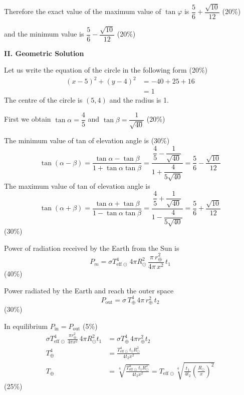 Therefore the exact value of the maximum value of $\tan\varphi$ is
$\dfrac{5}{6} + \dfrac{\sqrt{10}}{12}$ \hfill(20\%)

and the minimum value is $\dfrac{5}{6} - \dfrac{\sqrt{10}}{12}$ \hfill(20\%)

\textbf{II. Geometric Solution}

Let us write the equation of the circle in the following form \hfill(20\%)
\begin{align*}
(x-5)^2 + (y-4)^2 &= -40 + 25 + 16\\
                  &= 1
\end{align*}
The centre of the circle is $(5,4)$ and the radius is 1.

First we obtain $\tan\alpha = \dfrac{4}{5}$ and
$\tan\beta = \dfrac{1}{\sqrt{40}}$ \hfill(20\%)

The minimum value of tan of elevation angle is \hfill(30\%)
\[
\tan(\alpha-\beta) = \frac{\tan\alpha - \tan\beta}{1 + \tan\alpha\tan\beta}
 = \frac{\dfrac{4}{5} - \dfrac{1}{\sqrt{40}}}{1 + \dfrac{4}{5\sqrt{40}}}
 = \frac{5}{6} - \frac{\sqrt{10}}{12}
\]
The maximum value of tan of elevation angle is
\[
\tan(\alpha+\beta) = \frac{\tan\alpha + \tan\beta}{1 - \tan\alpha\tan\beta}
 = \frac{\dfrac{4}{5} + \dfrac{1}{\sqrt{40}}}{1 - \dfrac{4}{5\sqrt{40}}}
 = \frac{5}{6} + \frac{\sqrt{10}}{12}
\]
\hfill(30\%)

Power of radiation received by the Earth from the Sun is
\[
P_m = \sigma T_{\mathrm{eff}\,\odot}^{4}\, 4\pi R_\odot^2\,
      \frac{\pi\, r_\oplus^2}{4\pi\, x^2}\, t_1
\]
\hfill(40\%)

Power radiated by the Earth and reach the outer space
\[
P_{\mathrm{out}} = \sigma\, T_\oplus^4\, 4\pi\, r_\oplus^2\, t_2
\]
\hfill(30\%)

In equilibrium $P_{\mathrm{in}} = P_{\mathrm{out}}$ \hfill(5\%)
\begin{align*}
\sigma T_{\mathrm{eff}\,\odot}^4\,\frac{\pi r_\oplus^2}{4\pi x^2}\,
  4\pi R_\odot^2 t_1 &= \sigma T_\oplus^4\, 4\pi r_\oplus^2 t_2\\
T_\oplus^4 &= \frac{T_{\mathrm{eff}\,\odot}^4\, t_1 R_\odot^2}{4 t_2 x^2}\\
T_\oplus &= \sqrt[4]{\frac{T_{\mathrm{eff}\,\odot}^4\, t_1 R_\odot^2}
                          {4 t_2 x^2}}
          = T_{\mathrm{eff}\,\odot}
            \sqrt[4]{\frac{t_1}{4 t_2}\left(\frac{R_\odot}{x}\right)^2}
\end{align*}
\hfill(25\%)


